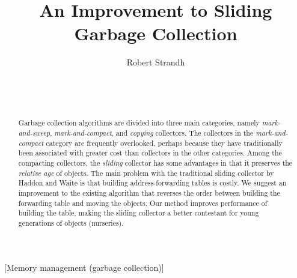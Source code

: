 \documentclass{acm_proc_article-sp}
\def\inputtex#1{}
\begin{document}
\title{An Improvement to Sliding Garbage Collection}
\author{\alignauthor
Robert Strandh\\
\\
\\
\\
}


\maketitle

\begin{abstract}
Garbage collection algorithms are divided into three main categories,
namely \emph{mark-and-sweep}, \emph{mark-and-compact}, and
\emph{copying} collectors.  The collectors in the
\emph{mark-and-compact} category are frequently overlooked, perhaps
because they have traditionally been associated with greater cost than
collectors in the other categories.  Among the compacting collectors,
the \emph{sliding} collector has some advantages in that it preserves
the \emph{relative age} of objects.  The main problem with the
traditional sliding collector by Haddon and Waite \cite{Haddon:1967}
is that building address-forwarding tables is costly.  We suggest an
improvement to the existing algorithm that reverses the order between
building the forwarding table and moving the objects.  Our method
improves performance of building the table, making the sliding
collector a better contestant for young generations of objects
(nurseries).
\end{abstract}

[Memory management
(garbage collection)]



\inputtex{sec-introduction.tex}
\inputtex{sec-previous.tex}
\inputtex{sec-our-method.tex}
\inputtex{sec-performance.tex}
\inputtex{sec-conclusions.tex}



\end{document}
